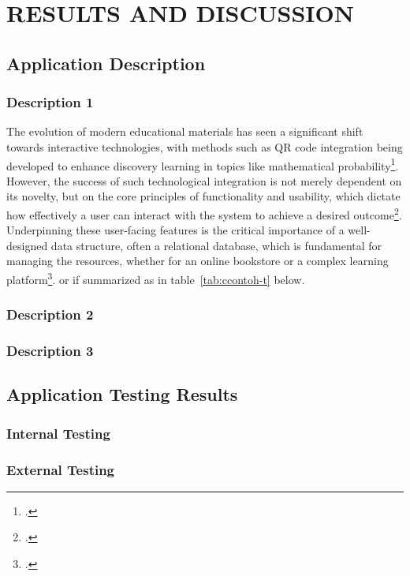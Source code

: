 \chapter{RESULTS AND DISCUSSION}
	\section{Application Description}
		\subsection{Description 1}
		The evolution of modern educational materials has seen a significant shift towards interactive technologies, with methods such as QR code integration being developed to enhance discovery learning in topics like mathematical probability\footcite{ramadhan2024}. However, the success of such technological integration is not merely dependent on its novelty, but on the core principles of functionality and usability, which dictate how effectively a user can interact with the system to achieve a desired outcome\footcite{goodwin1987}. Underpinning these user-facing features is the critical importance of a well-designed data structure, often a relational database, which is fundamental for managing the resources, whether for an online bookstore or a complex learning platform\footcite{alhusain2016}.
		or if summarized as in table~\ref{tab:ccontoh-t} below.
		\contohtabel
		
		\subsection{Description 2}
		\lipsum[1]
		
		\subsection{Description 3}
		\lipsum[1]
		
	\section{Application Testing Results}
		
		\subsection{Internal Testing}
		\lipsum[2]
		
		\subsection{External Testing}
		\lipsum[2]